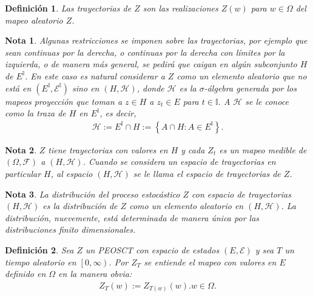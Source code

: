 \documentclass{article}
\newtheorem{Def}{Definición}
\newtheorem{Note}{Nota}
\begin{document}
\begin{Def}
Las trayectorias de $Z$ son las realizaciones $Z\left(w\right)$ para $w\in\Omega$ del mapeo aleatorio $Z$.
\end{Def}

\begin{Note}
Algunas restricciones se imponen sobre las trayectorias, por ejemplo que sean continuas por la derecha, o continuas por la derecha con l\'imites por la izquierda, o de manera m\'as general, se pedir\'a que caigan en alg\'un subconjunto $H$ de $E^{\mathbb{I}}$. En este caso es natural considerar a $Z$ como un elemento aleatorio que no est\'a en $\left(E^{\mathbb{I}},\mathcal{E}^{\mathbb{I}}\right)$ sino en $\left(H,\mathcal{H}\right)$, donde $\mathcal{H}$ es la $\sigma$-\'algebra generada por los mapeos proyecci\'on que toman a $z\in H$ a $z_{t}\in E$ para $t\in\mathbb{I}$. A $\mathcal{H}$ se le conoce como la traza de $H$ en $E^{\mathbb{I}}$, es decir,
\begin{eqnarray}
\mathcal{H}:=E^{\mathbb{I}}\cap H:=\left\{A\cap H:A\in E^{\mathbb{I}}\right\}.
\end{eqnarray}
\end{Note}


\begin{Note}
$Z$ tiene trayectorias con valores en $H$ y cada $Z_{t}$ es un mapeo medible de $\left(\Omega,\mathcal{F}\right)$ a $\left(H,\mathcal{H}\right)$. Cuando se considera un espacio de trayectorias en particular $H$, al espacio $\left(H,\mathcal{H}\right)$ se le llama el espacio de trayectorias de $Z$.
\end{Note}

\begin{Note}
La distribuci\'on del proceso estoc\'astico $Z$ con espacio de trayectorias $\left(H,\mathcal{H}\right)$ es la distribuci\'on de $Z$ como  un elemento aleatorio en $\left(H,\mathcal{H}\right)$. La distribuci\'on, nuevemente, est\'a determinada de manera \'unica por las distribuciones finito dimensionales.
\end{Note}


\begin{Def}
Sea $Z$ un PEOSCT  con espacio de estados $\left(E,\mathcal{E}\right)$ y sea $T$ un tiempo aleatorio en $\left[0,\infty\right)$. Por $Z_{T}$ se entiende el mapeo con valores en $E$ definido en $\Omega$ en la manera obvia:
\begin{eqnarray*}
Z_{T}\left(w\right):=Z_{T\left(w\right)}\left(w\right). w\in\Omega.
\end{eqnarray*}
\end{Def}
\end{document}
